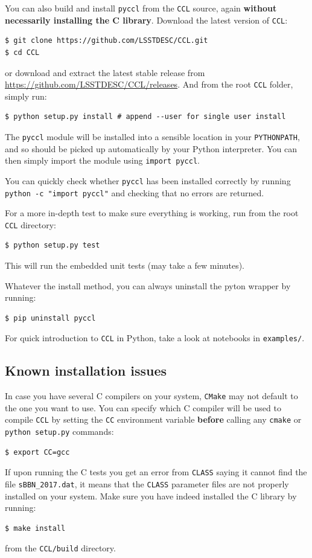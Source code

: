 \documentclass[\docopts]{\docclass}
\newcommand{\ccl}{{\tt CCL}\xspace}
\begin{document}
You can also build and install {\tt pyccl} from the \ccl source, again {\bf without necessarily
installing the C library}. Download the latest version of \ccl:
\begin{verbatim}
$ git clone https://github.com/LSSTDESC/CCL.git
$ cd CCL
\end{verbatim}
or download and extract the latest stable release from \url{https://github.com/LSSTDESC/CCL/releases}. And from the root \ccl folder, simply run:
\begin{verbatim}
$ python setup.py install # append --user for single user install
\end{verbatim}

The {\tt pyccl} module will be installed into a sensible location in your {\tt PYTHONPATH},
and so should be picked up automatically by your Python interpreter. You can then simply
import the module using {\tt import pyccl}.

You can quickly check whether {\tt pyccl} has been installed correctly by running
{\tt python -c "import pyccl"} and checking that no errors are returned.

For a more in-depth test to make sure everything is working, run from the root
\ccl directory:
\begin{verbatim}
$ python setup.py test
\end{verbatim}
This will run the embedded unit tests (may take a few minutes).

Whatever the install method, you can always uninstall the pyton wrapper by running:
\begin{verbatim}
$ pip uninstall pyccl
\end{verbatim}

For quick introduction to \ccl in Python, take a look at notebooks in {\tt examples/}.

\subsection{Known installation issues}

In case you have several C compilers on your system, {\tt CMake} may not default
to the one you want to use. You can specify which C compiler will be used to compile \ccl by setting the {\tt CC} environment variable {\bf before} calling any {\tt cmake} or {\tt python setup.py} commands:
\begin{verbatim}
$ export CC=gcc
\end{verbatim}

If upon running the C tests you get an error from {\tt CLASS} saying it cannot find the file {\tt sBBN\_2017.dat}, it means that the {\tt CLASS} parameter files are not properly installed on your system. Make sure you have indeed installed the C library by running:
\begin{verbatim}
$ make install
\end{verbatim}
from the  {\tt CCL/build} directory.
\end{document}
